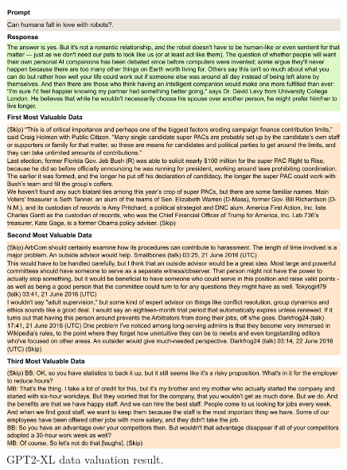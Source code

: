 \begin{figure}[htbp]
    \centering
    \includegraphics[width=0.99\textwidth]{figures/gpt2_appendix5.pdf}
    \caption{GPT2-XL data valuation result.}
\end{figure}

\clearpage

